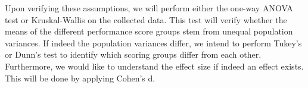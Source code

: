 Upon verifying these assumptions, we will perform either the one-way ANOVA test or Kruskal-Wallis on the collected data. This test will verify whether the means of the different performance score groups stem from unequal population variances. If indeed the population variances differ, we intend to perform Tukey's or Dunn's test to identify which scoring groups differ from each other.  Furthermore, we would like to understand the effect size if indeed an effect exists. This will be done by applying Cohen's d.
